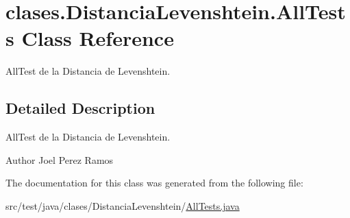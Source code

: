 \hypertarget{classclases_1_1_distancia_levenshtein_1_1_all_tests}{}\section{clases.\+Distancia\+Levenshtein.\+All\+Tests Class Reference}
\label{classclases_1_1_distancia_levenshtein_1_1_all_tests}


All\+Test de la Distancia de Levenshtein.  




\subsection{Detailed Description}
All\+Test de la Distancia de Levenshtein. 

\begin{DoxyAuthor}{Author}
Joel Perez Ramos 
\end{DoxyAuthor}


The documentation for this class was generated from the following file\+:\begin{DoxyCompactItemize}
\item 
src/test/java/clases/\+Distancia\+Levenshtein/\hyperlink{_all_tests_8java}{All\+Tests.\+java}\end{DoxyCompactItemize}
